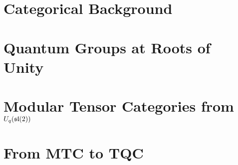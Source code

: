 \mediumspacing

\chapter{Categorical Background} 
\label{chap:categoricalbackground} 
\doublespacing


\mediumspacing

\chapter{Quantum Groups at Roots of Unity} 
\label{chap:uqsl2} 
\doublespacing


\mediumspacing


\chapter{Modular Tensor Categories from $U_q(\mathfrak{sl}(2))$} 
\label{chap:MTCfromuqsl2} 
\doublespacing


\mediumspacing

\chapter{From MTC to TQC} 
\label{chap:MTCtoTQC} 
%

\mediumspacing


\clearpage
{}
\nocite{*}




%





